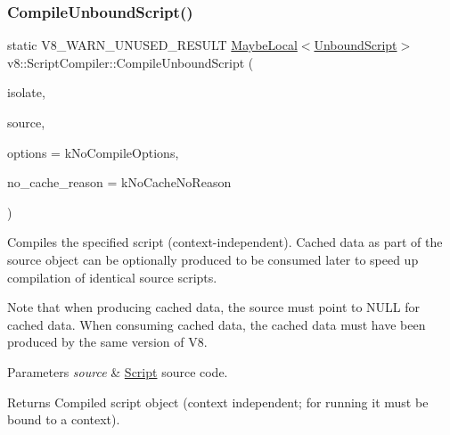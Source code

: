 \subsubsection{\texorpdfstring{Compile\+Unbound\+Script()}{CompileUnboundScript()}}
{\footnotesize\ttfamily static V8\+\_\+\+W\+A\+R\+N\+\_\+\+U\+N\+U\+S\+E\+D\+\_\+\+R\+E\+S\+U\+LT \mbox{\hyperlink{classv8_1_1MaybeLocal}{Maybe\+Local}}$<$\mbox{\hyperlink{classv8_1_1UnboundScript}{Unbound\+Script}}$>$ v8\+::\+Script\+Compiler\+::\+Compile\+Unbound\+Script (\begin{DoxyParamCaption}\item[{Isolate $\ast$}]{isolate,  }\item[{\mbox{\hyperlink{classv8_1_1ScriptCompiler_1_1Source}{Source}} $\ast$}]{source,  }\item[{Compile\+Options}]{options = {\ttfamily kNoCompileOptions},  }\item[{\mbox{\hyperlink{classv8_1_1ScriptCompiler_a7f13fa15484cfc500ae51927756e0d60}{No\+Cache\+Reason}}}]{no\+\_\+cache\+\_\+reason = {\ttfamily kNoCacheNoReason} }\end{DoxyParamCaption})\hspace{0.3cm}{\ttfamily [static]}}

Compiles the specified script (context-\/independent). Cached data as part of the source object can be optionally produced to be consumed later to speed up compilation of identical source scripts.

Note that when producing cached data, the source must point to N\+U\+LL for cached data. When consuming cached data, the cached data must have been produced by the same version of V8.


\begin{DoxyParams}{Parameters}
{\em source} & \mbox{\hyperlink{classv8_1_1Script}{Script}} source code. \\
\hline
\end{DoxyParams}
\begin{DoxyReturn}{Returns}
Compiled script object (context independent; for running it must be bound to a context). 
\end{DoxyReturn}
\mbox{\label{classv8_1_1ScriptCompiler_a3083edf7f887a38f1024d11c0dd7ccdb}} 
